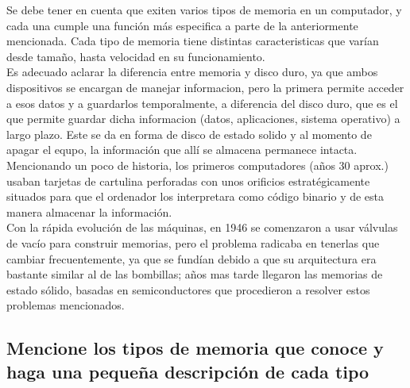 \documentclass{article}
\begin{document}
\noindent
Se debe tener en cuenta que exiten varios tipos de memoria en un computador, y cada una cumple una función más especifica a parte de la anteriormente mencionada. Cada tipo de memoria tiene distintas caracteristicas que varían desde tamaño, hasta velocidad en su funcionamiento.\\
\noindent
Es adecuado aclarar la diferencia entre memoria y disco duro, ya que ambos dispositivos se encargan de manejar informacion, pero la primera permite acceder a esos datos y a guardarlos temporalmente, a diferencia del disco duro, que es el que permite guardar dicha informacion (datos, aplicaciones, sistema operativo) a largo plazo. Este se da en forma de disco de estado solido y al momento de apagar el equpo, la información que allí se almacena permanece intacta.\\

\noindent
Mencionando un poco de historia, los primeros computadores (años 30 aprox.) usaban tarjetas de cartulina perforadas con unos orificios estratégicamente situados para que el ordenador los interpretara como código binario y de esta manera almacenar la información.\\
\noindent
Con la rápida evolución de las máquinas, en 1946 se comenzaron a usar válvulas de vacío para construir memorias, pero el problema radicaba en tenerlas que cambiar frecuentemente, ya que se fundían debido a que su arquitectura era bastante similar al de las bombillas; años mas tarde llegaron las memorias de estado sólido, basadas en semiconductores que procedieron a resolver estos problemas mencionados. 

\subsection{Mencione los tipos de memoria que conoce y haga una pequeña descripción de cada tipo}
%
\end{document}

